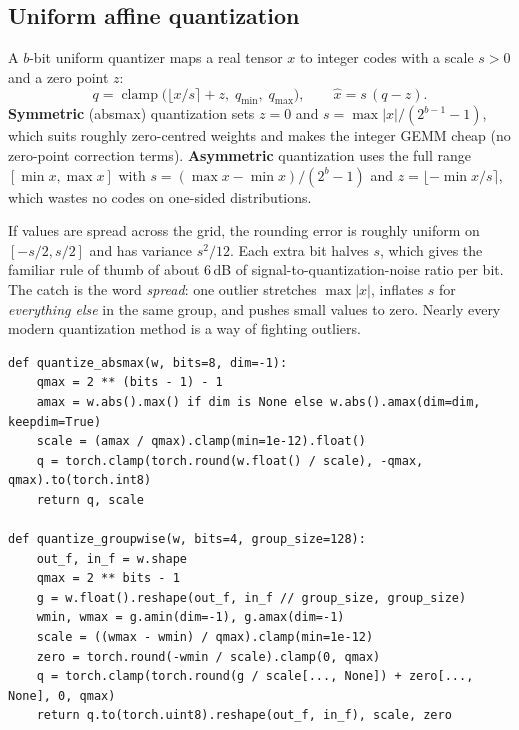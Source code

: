 \subsection{Uniform affine quantization}
A $b$-bit uniform quantizer maps a real tensor $x$ to integer codes with a scale $s>0$
and a zero point $z$:
\begin{equation}
  q = \operatorname{clamp}\!\Big(\big\lfloor x/s \big\rceil + z,\; q_{\min},\; q_{\max}\Big),
  \qquad \hat x = s\,(q - z).
  \label{eq:efficient:affine}
\end{equation}
\textbf{Symmetric} (absmax) quantization sets $z=0$ and $s=\max|x|/(2^{b-1}-1)$, which
suits roughly zero-centred weights and makes the integer GEMM cheap (no zero-point
correction terms). \textbf{Asymmetric} quantization uses the full range
$[\min x,\max x]$ with $s=(\max x-\min x)/(2^b-1)$ and $z=\lfloor -\min x/s\rceil$, which
wastes no codes on one-sided distributions.

If values are spread across the grid, the rounding error is roughly uniform on
$[-s/2,s/2]$ and has variance $s^2/12$. Each extra bit halves $s$, which gives the
familiar rule of thumb of about 6\,dB of signal-to-quantization-noise ratio per bit.
The catch is the word \emph{spread}: one outlier stretches $\max|x|$, inflates $s$ for
\emph{everything else} in the same group, and pushes small values to zero. Nearly every
modern quantization method is a way of fighting outliers.

\begin{lstlisting}[caption={Symmetric absmax and asymmetric group-wise quantization
(from \ident{llmsys/quant.py}).},label={lst:efficient:absmax}]
def quantize_absmax(w, bits=8, dim=-1):
    qmax = 2 ** (bits - 1) - 1
    amax = w.abs().max() if dim is None else w.abs().amax(dim=dim, keepdim=True)
    scale = (amax / qmax).clamp(min=1e-12).float()
    q = torch.clamp(torch.round(w.float() / scale), -qmax, qmax).to(torch.int8)
    return q, scale

def quantize_groupwise(w, bits=4, group_size=128):
    out_f, in_f = w.shape
    qmax = 2 ** bits - 1
    g = w.float().reshape(out_f, in_f // group_size, group_size)
    wmin, wmax = g.amin(dim=-1), g.amax(dim=-1)
    scale = ((wmax - wmin) / qmax).clamp(min=1e-12)
    zero = torch.round(-wmin / scale).clamp(0, qmax)
    q = torch.clamp(torch.round(g / scale[..., None]) + zero[..., None], 0, qmax)
    return q.to(torch.uint8).reshape(out_f, in_f), scale, zero
\end{lstlisting}

